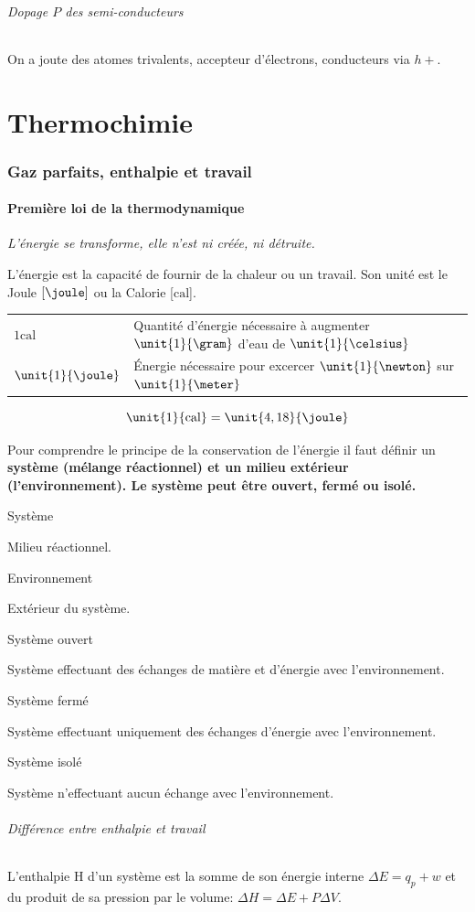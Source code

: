\documentclass[11pt,a4paper,french]{article}
\renewcommand{\textbf}[1]{\begingroup\bfseries\mathversion{bold}#1\endgroup}
\newcommand\calo{\mathrm{cal}}
\begin{document}
\paragraph{Dopage $P$ des semi-conducteurs}
On a joute des atomes trivalents, accepteur d'électrons, conducteurs via $h+$.


\part{Thermochimie}
\section{Gaz parfaits, enthalpie et travail}
\subsection{Première loi de la thermodynamique}
\emph{L'énergie se transforme, elle n'est ni créée, ni détruite.}

L'énergie est la capacité de fournir de la chaleur ou un travail.
Son unité est le Joule $[\joule]$ ou la Calorie [$\calo$].
\begin{center}
	\begin{tabular}{ll}
		$\unit{1}{\calo}$ & Quantité  d'énergie nécessaire à augmenter $\unit{1}{\gram}$ d'eau de $\unit{1}{\celsius}$\\
		$\unit{1}{\joule}$ & \'Energie nécessaire pour excercer $\unit{1}{\newton}$ sur $\unit{1}{\meter}$
	\end{tabular}
\end{center}
\[ \unit{1}{\calo} = \unit{4,18}{\joule} \]

Pour comprendre le principe de la conservation de l'énergie il faut définir un \textbf{système} (mélange réactionnel) et un milieu extérieur (l'environnement).
Le système peut être ouvert, fermé ou isolé.

\subparagraph{Système} Milieu réactionnel.
\subparagraph{Environnement} Extérieur du système.
\subparagraph{Système ouvert} Système effectuant des échanges de matière et d'énergie avec l'environnement.
\subparagraph{Système fermé} Système effectuant uniquement des échanges d'énergie avec l'environnement.
\subparagraph{Système isolé} Système n'effectuant aucun échange avec l'environnement.

\paragraph{Différence entre enthalpie et travail} L'enthalpie H d'un système est la somme de son énergie interne $\Delta E=q_p+w$ et du produit de sa pression par le volume: $\Delta H=\Delta E+P\Delta V$.\\
\end{document}
